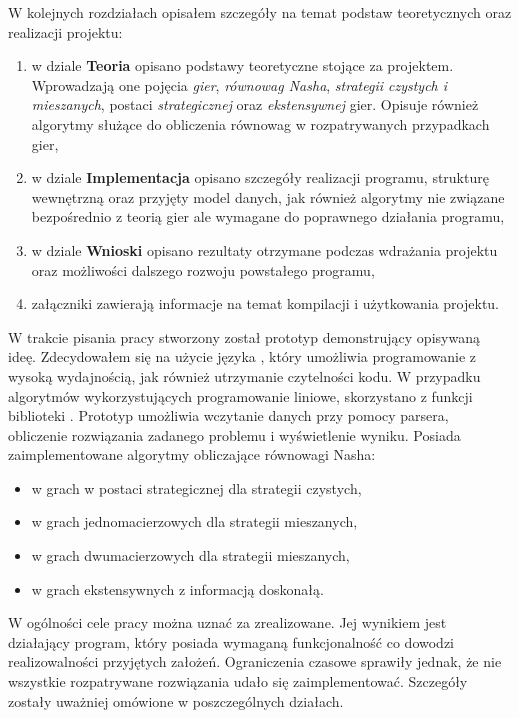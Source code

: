 \documentclass[polish]{standalone}
\begin{document}
W kolejnych rozdziałach opisałem szczegóły na temat podstaw teoretycznych oraz realizacji projektu:
\begin{enumerate}
\item w dziale \textbf{Teoria} opisano podstawy teoretyczne stojące za projektem. Wprowadzają one pojęcia \textit{gier},
\textit{równowag Nasha}, \textit{strategii czystych i mieszanych}, postaci \textit{strategicznej}
oraz \textit{ekstensywnej} gier. Opisuje również algorytmy służące do obliczenia równowag w rozpatrywanych przypadkach
gier,
\item w dziale \textbf{Implementacja} opisano szczegóły realizacji programu, strukturę wewnętrzną oraz przyjęty model
danych, jak również algorytmy nie związane bezpośrednio z teorią gier ale wymagane do poprawnego działania programu,
\item w dziale \textbf{Wnioski} opisano rezultaty otrzymane podczas wdrażania projektu oraz możliwości dalszego
rozwoju powstałego programu,
\item załączniki zawierają informacje na temat kompilacji i użytkowania projektu.
\end{enumerate}

W trakcie pisania pracy stworzony został prototyp demonstrujący opisywaną ideę. Zdecydowałem się na użycie języka
, który umożliwia programowanie z wysoką wydajnością, jak również utrzymanie czytelności kodu. W przypadku
algorytmów wykorzystujących programowanie liniowe, skorzystano z funkcji biblioteki . Prototyp umożliwia
wczytanie danych przy pomocy parsera, obliczenie rozwiązania zadanego problemu i wyświetlenie wyniku. Posiada
zaimplementowane algorytmy obliczające równowagi Nasha:
\begin{itemize}
\item w grach w postaci strategicznej dla strategii czystych,
\item w grach jednomacierzowych dla strategii mieszanych,
\item w grach dwumacierzowych dla strategii mieszanych,
\item w grach ekstensywnych z informacją doskonałą.
\end{itemize} 

W ogólności cele pracy można uznać za zrealizowane. Jej wynikiem jest działający program, który posiada wymaganą
funkcjonalność co dowodzi realizowalności przyjętych założeń. Ograniczenia czasowe sprawiły jednak, że nie wszystkie
rozpatrywane rozwiązania udało się zaimplementować. Szczegóły zostały uważniej omówione w poszczególnych działach.
\end{document}
